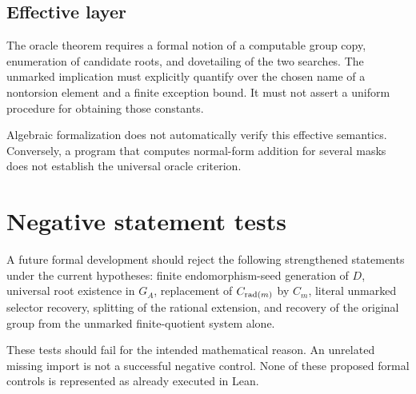 \subsection{Effective layer}
The oracle theorem requires a formal notion of a computable group copy, enumeration of candidate roots, and dovetailing of the two searches. The unmarked implication must explicitly quantify over the chosen name of a nontorsion element and a finite exception bound. It must not assert a uniform procedure for obtaining those constants.

Algebraic formalization does not automatically verify this effective semantics. Conversely, a program that computes normal-form addition for several masks does not establish the universal oracle criterion.

\section{Negative statement tests}
A future formal development should reject the following strengthened statements under the current hypotheses: finite endomorphism-seed generation of $D$, universal root existence in $G_A$, replacement of $C_{\operatorname{rad}(m)}$ by $C_m$, literal unmarked selector recovery, splitting of the rational extension, and recovery of the original group from the unmarked finite-quotient system alone.

These tests should fail for the intended mathematical reason. An unrelated missing import is not a successful negative control. None of these proposed formal controls is represented as already executed in Lean.
